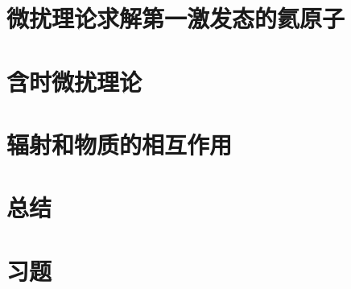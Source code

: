 \section{微扰理论求解第一激发态的氦原子}
\label{sec:9.7 Perturbation Treatment of the First Excited State of Helium}

\section{含时微扰理论}
\label{sec:9.8 Time-dependent Perturbation Theory}

\section{辐射和物质的相互作用}
\label{sec:9.9 Interaction of Radiation and Matter}

\section*{总结}

\section*{习题}